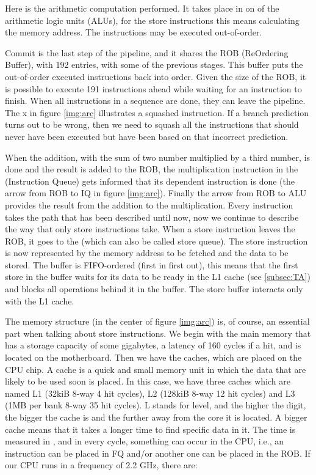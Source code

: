 
Here is the arithmetic computation performed. It takes place in on of the arithmetic logic units (ALUs), for the store instructions this means calculating the memory address. The instructions may be executed out-of-order. 

Commit is the last step of the pipeline, and it shares the ROB (ReOrdering Buffer),
with 192 entries, with some of the previous stages. This buffer puts the out-of-order executed instructions back into
order. Given the size of the ROB, it is possible to execute 191 instructions ahead
while waiting for an instruction to finish. When all instructions in a sequence are
done, they can leave the pipeline. The {\color{red}x} in figure \ref{img:arc} illustrates a squashed instruction.
If a branch prediction turns out to be wrong, then we need to squash all the instructions
that should never have been executed but have been based on that incorrect prediction.

When the addition, with the sum of two number multiplied by a third number, is done and the result is added to the ROB, the multiplication
instruction in the  (Instruction Queue) gets informed that its dependent instruction
is done (the arrow from ROB to IQ in figure \ref{img:arc}). Finally the arrow from ROB to
ALU provides the result from the addition to the multiplication.
Every instruction takes the path that has been described until now, now
we continue to describe the way that only store instructions take. When a store instruction
leaves the ROB, it goes to the  (which can also be called store queue).
The store instruction is now represented by the memory address to be fetched
and the data to be stored. The buffer is FIFO-ordered (first in first out), this means that the first
store in the buffer waits for its data to be ready in the L1 cache (see \ref{subsec:TA}) and blocks all operations behind it in the buffer. The store buffer
interacts only with the L1 cache.

The memory structure (in the center of figure \ref{img:arc}) is, of course, an essential part when talking
about store instructions. We begin with the main memory that has a storage capacity
of some gigabytes, a latency of 160 cycles if a hit, and is located on the motherboard. Then
we have the caches, which are placed on the CPU chip. A cache is a quick and small
memory unit in which the data that are likely to be used soon is placed.
In this case, we have three caches which are named L1 (32kiB 8-way 4 hit cycles), L2 (128kiB
8-way 12 hit cycles) and L3 (1MB per bank 8-way 35 hit cycles). L stands for
level, and the higher the digit, the bigger the cache is and the further away from the
core it is located. A bigger cache means that it takes a longer time to find specific data
in it. The time is measured in , and in every cycle, something can occur in the CPU, i.e., an instruction can be placed in FQ and/or another one can be placed in the ROB.
If our CPU runs in a frequency of 2.2 GHz, there are:

